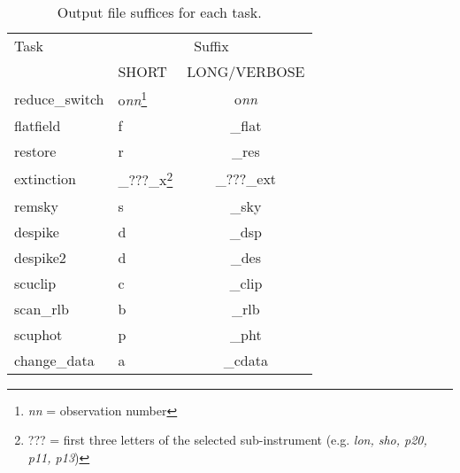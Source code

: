 \documentclass[twoside,11pt]{article}
\newcommand{\task}[1]{{\sf #1}}
\newcommand{\chgdata}{\htmlref{\task{change\_data}}{CHANGE_DATA}}
\newcommand{\resw}{\htmlref{\task{reduce\_switch}}{REDUCE_SWITCH}}
\newcommand{\flatf}{\htmlref{\task{flatfield}}{FLATFIELD}}
\newcommand{\scuphot}{\htmlref{\task{scuphot}}{SCUPHOT}}
\newcommand{\ext}{\htmlref{\task{extinction}}{EXTINCTION}}
\newcommand{\remsky}{\htmlref{\task{remsky}}{REMSKY}}
\newcommand{\restore}{\htmlref{\task{restore}}{RESTORE}}
\newcommand{\despike}{\htmlref{\task{despike}}{DESPIKE}}
\newcommand{\despikeb}{\htmlref{\task{despike2}}{DESPIKE2}}
\newcommand{\scuclip}{\htmlref{\task{scuclip}}{SCUCLIP}}
\newcommand{\scanrlb}{\htmlref{\task{scan\_rlb}}{SCAN_RLB}}
\newcommand{\htmlref}[2]{#1}
\begin{document}
\begin{table}
\begin{minipage}{\textwidth}
\caption{Output file suffices for each task.}
\label{tab_suffices}
\begin{center}
\begin{tabular}{llc}
\hline\hline
Task & \multicolumn{2}{c}{Suffix} \\ \cline{2-3} 
     & SHORT & LONG/VERBOSE  \\ \hline

\resw   & o\textit{nn}\footnote{\textit{nn} = observation number} & o\textit{nn} \\
\flatf  & f   & \_flat \\
\restore& r   & \_res  \\
\ext    & \_???\_x\footnote{??? = first three letters of the selected
sub-instrument (e.g. \textit{lon, sho, p20, p11, p13})} & \_???\_ext\\
\remsky & s   & \_sky \\
\despike & d  & \_dsp \\
\despikeb & d & \_des \\
\scuclip & c & \_clip \\
\scanrlb & b & \_rlb \\
\scuphot & p & \_pht \\
\chgdata & a  & \_cdata \\

\hline\hline
\end{tabular}
\end{center}
\end{minipage}
\end{table}
\end{document}
